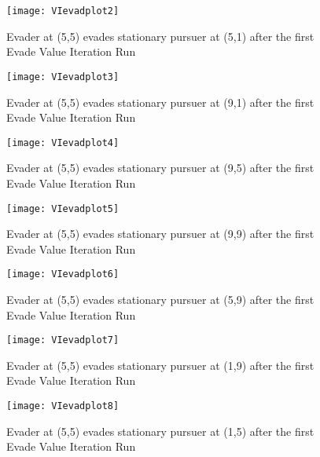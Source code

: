 \begin{figure}
\vspace{2.4in}
\centering
\texttt{[image: VIevadplot2]}
\caption{Evader at (5,5) evades stationary pursuer at (5,1) after the first Evade Value Iteration Run}
\label{VIevadplot2}
\end{figure}
\clearpage
\newpage

\begin{figure}
\vspace{2.4in}
\centering
\texttt{[image: VIevadplot3]}
\caption{Evader at (5,5) evades stationary pursuer at (9,1) after the first Evade Value Iteration Run}
\label{VIevadplot3}
\end{figure}
\clearpage
\newpage

\begin{figure}
\vspace{2.4in}
\centering
\texttt{[image: VIevadplot4]}
\caption{Evader at (5,5) evades stationary pursuer at (9,5) after the first Evade Value Iteration Run}
\label{VIevadplot4}
\end{figure}
\clearpage
\newpage

\begin{figure}
\vspace{2.4in}
\centering
\texttt{[image: VIevadplot5]}
\caption{Evader at (5,5) evades stationary pursuer at (9,9) after the first Evade Value Iteration Run}
\label{VIevadplot5}
\end{figure}
\clearpage
\newpage

\begin{figure}
\vspace{2.4in}
\centering
\texttt{[image: VIevadplot6]}
\caption{Evader at (5,5) evades stationary pursuer at (5,9) after the first Evade Value Iteration Run}
\label{VIevadplot6}
\end{figure}
\clearpage
\newpage

\begin{figure}
\vspace{2.4in}
\centering
\texttt{[image: VIevadplot7]}
\caption{Evader at (5,5) evades stationary pursuer at (1,9) after the first Evade Value Iteration Run}
\label{VIevadplot7}
\end{figure}
\clearpage
\newpage

\begin{figure}
\vspace{2.4in}
\centering
\texttt{[image: VIevadplot8]}
\caption{Evader at (5,5) evades stationary pursuer at (1,5) after the first Evade Value Iteration Run}
\label{VIevadplot8}
\end{figure}
\clearpage
\newpage

